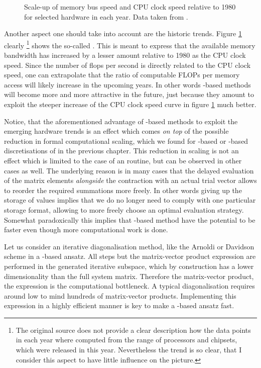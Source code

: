 \begin{figure}
	\centering
	\caption[Scale-up of memory bus speed and CPU clock speed]
	{Scale-up of memory bus speed and CPU clock speed
		relative to 1980 for selected hardware in each year.
		Data taken from \cite{Gocon2014}.}
	\label{fig:MemCpuSpeedup}
\end{figure}
Another aspect one should take into account are the historic trends.
Figure \ref{fig:MemCpuSpeedup} clearly%
\footnote{The original source \cite{Gocon2014}
does not provide a clear description how the data points in each year
where computed from the range of processors and chipsets,
which were released in this year.
Nevertheless the trend is so clear, that I consider this aspect
to have little influence on the picture.}
shows the so-called .
This is meant to express that the available memory bandwidth
has increased by a lesser amount relative to 1980 as the CPU clock speed.
Since the number of flops per second is directly related to the CPU clock speed,
one can extrapolate that the ratio of computable FLOPs per memory access
will likely increase in the upcoming years.
In other words \contraction-based methods
will become more and more attractive in the future,
just because they amount to exploit the steeper increase of the CPU clock
speed curve in figure \ref{fig:MemCpuSpeedup} much better.

Notice, that the aforementioned advantage of \contraction-based methods
to exploit the emerging hardware trends
is an effect which comes \emph{on top}
of the possible reduction in formal computational scaling,
which we found for \FE-based or \CS-based discretisations of \HF in the previous chapter.
This reduction in scaling is not an effect
which is limited to the case of an \SCF routine,
but can be observed in other cases as well.
The underlying reason is in many cases
that the delayed evaluation of the matrix elements
\emph{alongside} the contraction with an actual trial vector
allows to reorder the required summations more freely.
In other words giving up the storage of values
implies that we do no longer need to comply with one particular storage format,
allowing to more freely choose an optimal evaluation strategy.
Somewhat paradoxically this implies that
\contraction-based method have the potential
to be faster even though more computational work is done.

Let us consider an iterative diagonalisation method,
like the Arnoldi or Davidson scheme
in a \contraction-based ansatz.
All steps but the matrix-vector product expression
are performed in the generated iterative subspace,
which by construction has a lower dimensionality
than the full system matrix.
Therefore the matrix-vector product,
\ie the \contraction expression is the computational bottleneck.
A typical diagonalisation requires
around low to mind hundreds of matrix-vector products.
Implementing this \contraction expression
in a highly efficient manner is
key to make a \contraction-based ansatz fast.

